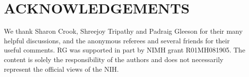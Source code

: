 \documentclass[9pt]{sig-alternate}
\begin{document}


\section{ACKNOWLEDGEMENTS}
We thank Sharon Crook, Shreejoy Tripathy and Padraig Gleeson for their many helpful discussions, and the anonymous referees and several friends for their useful comments.  
RG was supported in part by NIMH grant R01MH081905. 
The content is solely the responsibility of the authors and does not necessarily represent the official views of the NIH.
\vspace{5px}


\end{document}
